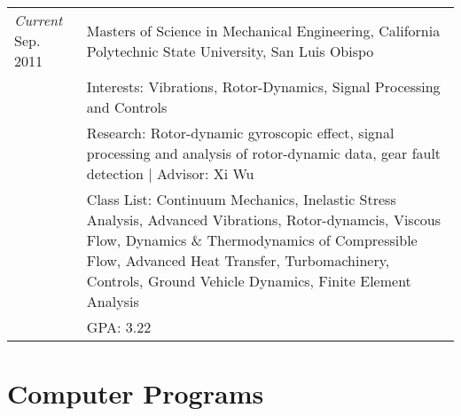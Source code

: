 \documentclass[10pt]{article} %
\begin{document}
	\begin{tabular}{p{.65in}|p{5.5in}}	
		\emph{Current} Sep. 2011 & Masters of Science in Mechanical Engineering,  California Polytechnic State University, San Luis Obispo\\
		& \footnotesize{Interests: Vibrations, Rotor-Dynamics, Signal Processing and Controls}\\
		& \footnotesize{Research: Rotor-dynamic gyroscopic effect, signal processing and analysis of rotor-dynamic data, gear fault detection | Advisor: Xi Wu}\\
		& \footnotesize{Class List: Continuum Mechanics, Inelastic Stress Analysis, Advanced Vibrations, Rotor-dynamcis, Viscous Flow, Dynamics \& Thermodynamics of Compressible Flow, Advanced Heat Transfer, Turbomachinery, Controls, Ground Vehicle Dynamics, Finite Element Analysis}\\
		& \footnotesize{GPA: 3.22}\\
	\end{tabular}





\section{Computer Programs}
\end{document}
